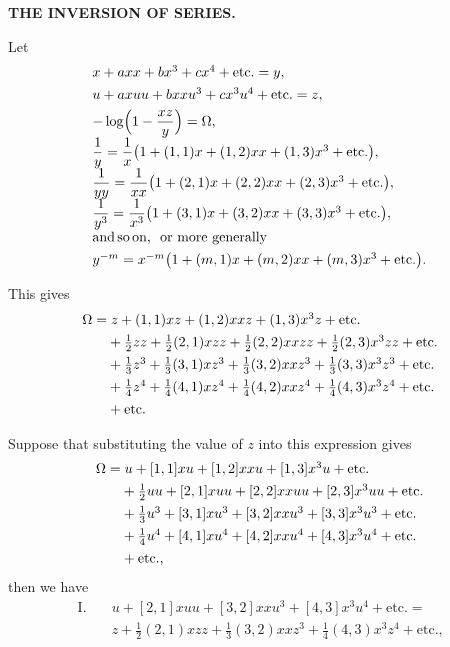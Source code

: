 \begin{center}
\textbf{THE INVERSION OF SERIES.}
\end{center}

\noindent\hspace*{\parindent}Let
\[
\begin{array}{l}
x+axx+bx^3+cx^4+\text{etc.}=y,\\[4pt]
u+axuu+bxxu^3+cx^3u^4+\text{etc.}=z,\\[4pt]
-\log\Bigl(1-\dfrac{xz}{y}\Bigr)=\Omega,\\[4pt]
\dfrac{1}{y}=\dfrac{1}{x}\bigl(1+(1,1)x+(1,2)xx+(1,3)x^3+\text{etc.}\bigr),\\[4pt]
\dfrac{1}{yy}=\dfrac{1}{xx}\bigl(1+(2,1)x+(2,2)xx+(2,3)x^3+\text{etc.}\bigr),\\[4pt]
\dfrac{1}{y^3}=\dfrac{1}{x^3}\bigl(1+(3,1)x+(3,2)xx+(3,3)x^3+\text{etc.}\bigr),\\[4pt]
\text{and\,so\,on,\ \ or more generally}\\[4pt]
y^{-m}=x^{-m}\bigl(1+(m,1)x+(m,2)xx+(m,3)x^3+\text{etc.}\bigr).
\end{array}
\]

\noindent This gives
\[
\begin{array}{l}
\Omega=z+(1,1)xz+(1,2)xxz+(1,3)x^3z+\text{etc.}\\[4pt]
\hphantom{\Omega=}+\tfrac{1}{2}zz+\tfrac{1}{2}(2,1)xzz+\tfrac{1}{2}(2,2)xxzz+\tfrac{1}{2}(2,3)x^3zz+\text{etc.}\\[4pt]
\hphantom{\Omega=}+\tfrac{1}{3}z^3+\tfrac{1}{3}(3,1)xz^3+\tfrac{1}{3}(3,2)xxz^3+\tfrac{1}{3}(3,3)x^3z^3+\text{etc.}\\[4pt]
\hphantom{\Omega=}+\tfrac{1}{4}z^4+\tfrac{1}{4}(4,1)xz^4+\tfrac{1}{4}(4,2)xxz^4+\tfrac{1}{4}(4,3)x^3z^4+\text{etc.}\\[4pt]
\hphantom{\Omega=}+\text{etc.}
\end{array}
\]

Suppose that substituting the value of $z$ into this expression gives
\[
\begin{array}{l}
\Omega=u+[1,1]xu+[1,2]xxu+[1,3]x^3u+\text{etc.}\\[4pt]
\hphantom{\Omega=}+\tfrac{1}{2}uu+[2,1]xuu+[2,2]xxuu+[2,3]x^3uu+\text{etc.}\\[4pt]
\hphantom{\Omega=}+\tfrac{1}{3}u^3+[3,1]xu^3+[3,2]xxu^3+[3,3]x^3u^3+\text{etc.}\\[4pt]
\hphantom{\Omega=}+\tfrac{1}{4}u^4+[4,1]xu^4+[4,2]xxu^4+[4,3]x^3u^4+\text{etc.}\\[4pt]
\hphantom{\Omega=}+\text{etc.,}
\end{array}
\]
\noindent then we have
\[
\begin{aligned}\text{I.}\quad &u+[2,1]xuu+[3,2]xxu^3+[4,3]x^3u^4+\text{etc.}=\\ &z+\tfrac{1}{2}(2,1)xzz+\tfrac{1}{3}(3,2)xxz^3+\tfrac{1}{4}(4,3)x^3z^4+\text{etc.,}
\end{aligned}
\]


